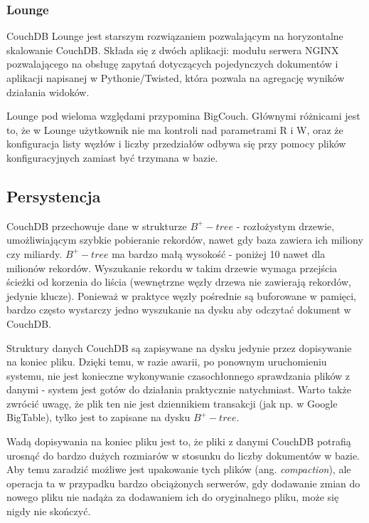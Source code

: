 \subsubsection*{Lounge}

CouchDB Lounge jest starszym rozwiązaniem pozwalającym na horyzontalne skalowanie CouchDB.
Składa się z dwóch aplikacji: modułu serwera NGINX pozwalającego na obsługę zapytań dotyczących pojedynczych dokumentów i aplikacji napisanej w Pythonie/Twisted, która pozwala na agregację wyników działania widoków.

Lounge pod wieloma względami przypomina BigCouch.
Głównymi różnicami jest to, że w Lounge użytkownik nie ma kontroli nad parametrami R i W, oraz że konfiguracja listy węzłów i liczby przedziałów odbywa się przy pomocy plików konfiguracyjnych zamiast być trzymana w bazie.

\subsection*{Persystencja}

CouchDB przechowuje dane w strukturze $B^+-tree$ - rozłożystym drzewie, umożliwiającym szybkie pobieranie rekordów, nawet gdy baza zawiera ich miliony czy miliardy.
$B^+-tree$ ma bardzo małą wysokość - poniżej 10 nawet dla milionów rekordów.
Wyszukanie rekordu w takim drzewie wymaga przejścia ścieżki od korzenia do liścia (wewnętrzne węzły drzewa nie zawierają rekordów, jedynie klucze).
Ponieważ w praktyce węzły pośrednie są buforowane w pamięci, bardzo często wystarczy jedno wyszukanie na dysku aby odczytać dokument w CouchDB.

Struktury danych CouchDB są zapisywane na dysku jedynie przez dopisywanie na koniec pliku.
Dzięki temu, w razie awarii, po ponownym uruchomieniu systemu, nie jest konieczne wykonywanie czasochłonnego sprawdzania plików z danymi - system jest gotów do działania praktycznie natychmiast.
Warto także zwrócić uwagę, że plik ten nie jest dziennikiem transakcji (jak np. w Google BigTable), tylko jest to zapisane na dysku $B^+-tree$.

Wadą dopisywania na koniec pliku jest to, że pliki z danymi CouchDB potrafią urosnąć do bardzo dużych rozmiarów w stosunku do liczby dokumentów w bazie.
Aby temu zaradzić możliwe jest upakowanie tych plików (ang. \emph{compaction}), ale operacja ta w przypadku bardzo obciążonych serwerów, gdy dodawanie zmian do nowego pliku nie nadąża za dodawaniem ich do oryginalnego pliku, może się nigdy nie skończyć.

